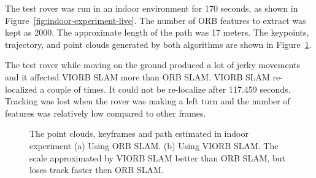 The test rover was run in an indoor environment for 170 seconds, as shown in Figure~\ref{fig:indoor-experiment-live}. The number of ORB features to extract was kept as 2000. The approximate length of the path was 17 meters. The keypoints, trajectory, and point clouds generated by both algorithms are shown in Figure~\ref{fig:indoor-path-visualization}.

The test rover while moving on the ground produced a lot of jerky movements and it affected VIORB SLAM more than ORB SLAM. VIORB SLAM re-localized a couple of times. It could not be re-localize after 117.459 seconds. Tracking was lost when the rover was making a left turn and the number of features was relatively low compared to other frames.

\begin{figure}[h]
	
	\caption[Indoor experiment.]{\small 
		The point clouds, keyframes and path estimated in indoor experiment (a) Using ORB SLAM. (b) Using VIORB SLAM. The scale approximated by VIORB SLAM better than ORB SLAM, but loses track faster then ORB SLAM.}
	\label{fig:indoor-path-visualization}
	
\end{figure}

